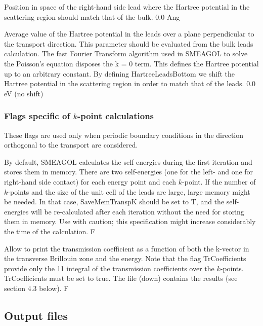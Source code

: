 \documentclass[11pt]{article}
\begin{document}
{
{Position in space of the right-hand side lead where the Hartree potential in the scattering region should match that of the bulk.}
{0.0 Ang}

{Average value of the Hartree potential in the leads over a plane perpendicular to the transport direction. This parameter should be evaluated from the bulk leads calculation. The fast Fourier Transform algorithm used in SMEAGOL to solve the Poisson’s equation disposes the k = 0 term. This defines the Hartree potential up to an arbitrary constant. By defining HartreeLeadsBottom we shift the Hartree potential in the scattering region in order to match that of the leads.}
{0.0 eV (no shift)}

\subsubsection{Flags specific of $k$-point calculations}
These flags are used only when periodic boundary conditions in the direction orthogonal to the transport are considered.

\vspace{0.5cm}
{By default, SMEAGOL calculates the self-energies during the first iteration and stores them in memory. There are two self-energies (one for the left- and one for right-hand side contact) for each energy point and each $k$-point. If the number of $k$-points and the size of the unit cell of the leads are large, large memory might be needed. In that case, SaveMemTranspK should be set to T, and the self-energies will be re-calculated after each iteration without the need for storing them in memory. Use with caution; this specification might increase considerably the time of the calculation.}
{F}

{Allow to print the transmission coefficient as a function of both the k-vector in the transverse Brillouin zone and the energy. Note that the flag TrCoefficients provide only the 11 integral of the transmission coefficients over the $k$-points. TrCoefficients must be set to true. The file  (down) contains the results (see section 4.3 below).}
{F}

\subsection{Output files}

}
\end{document}
